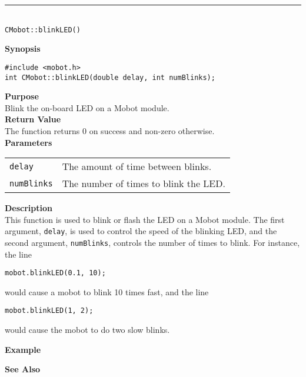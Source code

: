 \noindent
\vspace{5pt}
\rule{4.5in}{0.015in}\\
\noindent
{\LARGE \texttt{CMobot::blinkLED()}}\\
{}

\noindent
{\bf Synopsis}
\vspace{-8pt}
\begin{verbatim}
#include <mobot.h>
int CMobot::blinkLED(double delay, int numBlinks);
\end{verbatim}

\noindent
{\bf Purpose}\\
Blink the on-board LED on a Mobot module.\\

\noindent
{\bf Return Value}\\
The function returns 0 on success and non-zero otherwise.\\

\noindent
{\bf Parameters}\\
\vspace{-0.1in}
\begin{description}
\item               
\begin{tabular}{p{15 mm}p{125 mm}}
\texttt{delay} & The amount of time between blinks. \\
\texttt{numBlinks} & The number of times to blink the LED. \\
\end{tabular}
\end{description}
\noindent
{\bf Description}\\
This function is used to blink or flash the LED on a Mobot module. The first
argument, \texttt{delay}, is used to control the speed of the blinking
LED, and the second argument, \texttt{numBlinks}, controls the number of times
to blink. For instance, the line
\begin{verbatim}
mobot.blinkLED(0.1, 10);
\end{verbatim}
would cause a mobot to blink 10 times fast, and the line
\begin{verbatim}
mobot.blinkLED(1, 2);
\end{verbatim}
would cause the mobot to do two slow blinks.

\noindent
{\bf Example}\\
\noindent

\noindent
{\bf See Also}\\

